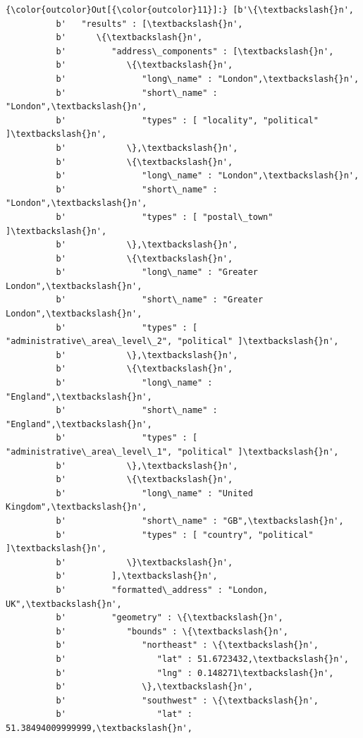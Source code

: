 \documentclass[11pt]{article}
\begin{document}
\begin{Verbatim}[commandchars=\\\{\}]
{\color{outcolor}Out[{\color{outcolor}11}]:} [b'\{\textbackslash{}n',
          b'   "results" : [\textbackslash{}n',
          b'      \{\textbackslash{}n',
          b'         "address\_components" : [\textbackslash{}n',
          b'            \{\textbackslash{}n',
          b'               "long\_name" : "London",\textbackslash{}n',
          b'               "short\_name" : "London",\textbackslash{}n',
          b'               "types" : [ "locality", "political" ]\textbackslash{}n',
          b'            \},\textbackslash{}n',
          b'            \{\textbackslash{}n',
          b'               "long\_name" : "London",\textbackslash{}n',
          b'               "short\_name" : "London",\textbackslash{}n',
          b'               "types" : [ "postal\_town" ]\textbackslash{}n',
          b'            \},\textbackslash{}n',
          b'            \{\textbackslash{}n',
          b'               "long\_name" : "Greater London",\textbackslash{}n',
          b'               "short\_name" : "Greater London",\textbackslash{}n',
          b'               "types" : [ "administrative\_area\_level\_2", "political" ]\textbackslash{}n',
          b'            \},\textbackslash{}n',
          b'            \{\textbackslash{}n',
          b'               "long\_name" : "England",\textbackslash{}n',
          b'               "short\_name" : "England",\textbackslash{}n',
          b'               "types" : [ "administrative\_area\_level\_1", "political" ]\textbackslash{}n',
          b'            \},\textbackslash{}n',
          b'            \{\textbackslash{}n',
          b'               "long\_name" : "United Kingdom",\textbackslash{}n',
          b'               "short\_name" : "GB",\textbackslash{}n',
          b'               "types" : [ "country", "political" ]\textbackslash{}n',
          b'            \}\textbackslash{}n',
          b'         ],\textbackslash{}n',
          b'         "formatted\_address" : "London, UK",\textbackslash{}n',
          b'         "geometry" : \{\textbackslash{}n',
          b'            "bounds" : \{\textbackslash{}n',
          b'               "northeast" : \{\textbackslash{}n',
          b'                  "lat" : 51.6723432,\textbackslash{}n',
          b'                  "lng" : 0.148271\textbackslash{}n',
          b'               \},\textbackslash{}n',
          b'               "southwest" : \{\textbackslash{}n',
          b'                  "lat" : 51.38494009999999,\textbackslash{}n',

\end{Verbatim}
\end{document}
